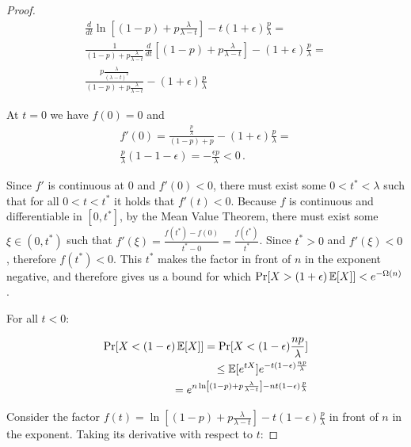 \begin{proof}
  \begin{align*}
    \frac{d}{dt} \ln\left[(1 - p) + p\frac{\lambda}{\lambda - t}\right] - t(1 + \epsilon)\frac{p}{\lambda} = \\
    \frac{1}{(1 - p) + p\frac{\lambda}{\lambda - t}} \frac{d}{dt} \left[(1 - p) + p\frac{\lambda}{\lambda - t}\right] - (1 + \epsilon)\frac{p}{\lambda} = \\
    \frac{p\frac{\lambda}{(\lambda - t)^2}}{(1 - p) + p\frac{\lambda}{\lambda - t}} - (1 + \epsilon)\frac{p}{\lambda}
  \end{align*}

  At $t = 0$ we have $f(0) = 0$ and
  \begin{align*}
    f'(0) = \frac{\frac{p}{\lambda}}{(1 - p) + p} - (1 + \epsilon)\frac{p}{\lambda} =\\
    \frac{p}{\lambda}(1 - 1 - \epsilon) = -\frac{\epsilon p}{\lambda} < 0\,.
  \end{align*}

  Since $f'$ is continuous at $0$ and $f'(0) < 0$, there must exist some $0 < t^* < \lambda$ such that for all
  $0 < t < t^*$ it holds that $f'(t) < 0$. Because $f$ is continuous and differentiable in $[0, t^*]$,
  by the Mean Value Theorem, there must exist some $\xi \in (0, t^*)$ such that
  $f'(\xi) = \frac{f(t^*) - f(0)}{t^* - 0} = \frac{f(t^*)}{t^*}$.
  Since $t^* > 0$ and $f'(\xi) < 0$, therefore $f(t^*) < 0$.
  This $t^*$ makes the factor in front of $n$ in the exponent negative, and therefore
  gives us a bound for which $\Pr[X > (1 + \epsilon)\mathop{{}\mathbb{E}}[X]] < e^{-\Omega(n)}$.

  For all $t < 0$:

  \begin{align*}
    \Pr[X < (1 - \epsilon)\mathop{{}\mathbb{E}}[X]] = \Pr[X < (1 - \epsilon)\frac{np}{\lambda}]\\
    \leq \mathop{{}\mathbb{E}}[e^{tX}] e^{-t(1 - \epsilon)\frac{np}{\lambda}} \\
    = e^{n \ln\left[(1 - p) + p\frac{\lambda}{\lambda - t}\right] - n t(1 - \epsilon)\frac{p}{\lambda}}
  \end{align*}

  Consider the factor
  $f(t) = \ln\left[(1 - p) + p\frac{\lambda}{\lambda - t}\right] - t(1 - \epsilon)\frac{p}{\lambda}$
  in front of $n$ in the exponent. Taking its derivative with respect to $t$:


\end{proof}
